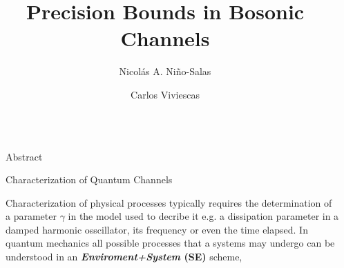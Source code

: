 \documentclass[final]{beamer}
\title{Precision Bounds in Bosonic Channels}
\author{Nicolás A. Niño-Salas \inst{1} \and Carlos Viviescas  \inst{2} }
\institute[shortinst]{Universidad Nacional de Colombia, Sede Bogotá }
\newlength{\sepwidth}
\newlength{\colwidth}
\newcommand{\separatorcolumn}{\begin{column}{\sepwidth}\end{column}}
\begin{document}
\begin{frame}[t]
\begin{columns}[t]
\separatorcolumn

\begin{column}{\colwidth}

  \begin{block}{Abstract}
  \end{block}

  \begin{block}{Characterization of Quantum Channels}
  \end{block}
  Characterization of physical processes typically requires the determination of a parameter $\gamma$ in the model used to decribe it e.g.
  a dissipation parameter in a damped harmonic osscillator, its frequency or even the time elapsed. In quantum mechanics
  all possible processes that a systems may undergo can be understood in an \textbf{\textit{Enviroment+System} (SE)} scheme,
\vspace{-0.025\linewidth}


\end{column}
\end{columns}
\end{frame}
\end{document}
